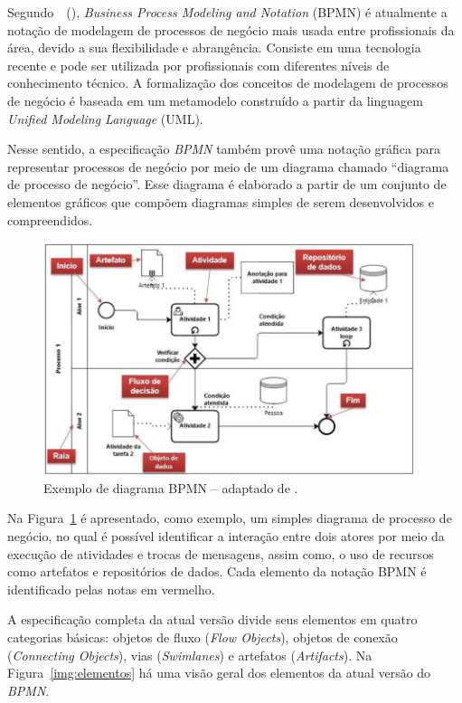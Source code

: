 Segundo~~(\citeyear{correia2015enhancing}), \textit{Business Process Modeling and Notation} (BPMN) é atualmente a notação de modelagem de processos de negócio mais usada entre profissionais da área, devido  a sua flexibilidade e abrangência. Consiste em uma tecnologia recente e pode ser utilizada por profissionais com diferentes níveis de conhecimento técnico. A formalização dos conceitos de modelagem de processos de negócio é baseada em um metamodelo construído a partir da linguagem \textit{Unified Modeling Language} (UML). 

Nesse sentido, a especificação \textit{BPMN} também provê uma notação gráfica para representar processos de negócio por meio de um diagrama chamado ``diagrama de processo de negócio''. Esse diagrama é elaborado a partir de um conjunto de elementos gráficos que compõem diagramas simples de serem desenvolvidos e
compreendidos. 

\begin{figure}[!ht]
\centering
\includegraphics[width=0.97\textwidth]{images/diagrama.png}
\caption{Exemplo de diagrama BPMN -- adaptado de \cite{Weske2012}.}
\label{diag}
\end{figure}

Na Figura~\ref{diag} é apresentado, como exemplo, um simples diagrama de processo de negócio, no qual é possível identificar a interação entre dois atores por meio da execução de atividades e trocas de mensagens, assim como, o uso de recursos como artefatos e repositórios de dados. Cada elemento da notação BPMN é identificado pelas notas em vermelho.

A especificação completa da atual versão divide seus elementos em quatro categorias básicas: objetos de fluxo (\textit{Flow Objects}), objetos de conexão (\textit{Connecting Objects}), vias (\textit{Swimlanes}) e artefatos (\textit{Artifacts}). 
Na Figura~\ref{img:elementos} há uma visão geral dos elementos da atual versão do \textit{BPMN}.


